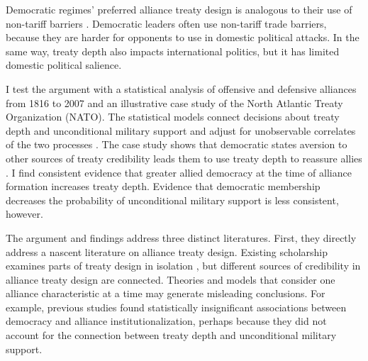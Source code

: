 \documentclass[12pt]{article}
\begin{document}
Democratic regimes' preferred alliance treaty design is analogous to their use of non-tariff barriers \citep{Kono2006}.
Democratic leaders often use non-tariff trade barriers, because they are harder for opponents to use in domestic political attacks.
In the same way, treaty depth also impacts international politics, but it has limited domestic political salience.


I test the argument with a statistical analysis of offensive and defensive alliances from 1816 to 2007 and an illustrative case study of the North Atlantic Treaty Organization (NATO).
The statistical models connect decisions about treaty depth and unconditional military support and adjust for unobservable correlates of the two processes \citep{Braumoelleretal2018}. 
The case study shows that democratic states aversion to other sources of treaty credibility leads them to use treaty depth to reassure allies \citep{SeawrightGerring2008, Seawright2016}. 
I find consistent evidence that greater allied democracy at the time of alliance formation increases treaty depth.
Evidence that democratic membership decreases the probability of unconditional military support is less consistent, however. 


The argument and findings address three distinct literatures.
First, they directly address a nascent literature on alliance treaty design.  
Existing scholarship examines parts of treaty design in isolation \citep{Benson2012, Mattes2012, Chibaetal2015}, but different sources of credibility in alliance treaty design are connected. 
Theories and models that consider one alliance characteristic at a time may generate misleading conclusions. 
For example, previous studies found statistically insignificant associations between democracy and alliance institutionalization, perhaps because they did not account for the connection between treaty depth and unconditional military support. 
\end{document}
